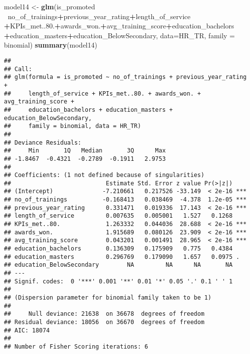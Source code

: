\documentclass[
]{article}
\newenvironment{Shaded}{\begin{snugshade}}{\end{snugshade}}
\newcommand{\DataTypeTok}[1]{\textcolor[rgb]{0.13,0.29,0.53}{#1}}
\newcommand{\FloatTok}[1]{\textcolor[rgb]{0.00,0.00,0.81}{#1}}
\newcommand{\KeywordTok}[1]{\textcolor[rgb]{0.13,0.29,0.53}{\textbf{#1}}}
\newcommand{\NormalTok}[1]{#1}
\newcommand{\OperatorTok}[1]{\textcolor[rgb]{0.81,0.36,0.00}{\textbf{#1}}}
\newcommand{\StringTok}[1]{\textcolor[rgb]{0.31,0.60,0.02}{#1}}
\begin{document}
\begin{Shaded}
\begin{Highlighting}[]
\NormalTok{model14 <-}\StringTok{ }\KeywordTok{glm}\NormalTok{(is_promoted }\OperatorTok{~}\NormalTok{no_of_trainings}\OperatorTok{+}\NormalTok{previous_year_rating}\OperatorTok{+}\NormalTok{length_of_service}
               \OperatorTok{+}\NormalTok{KPIs_met..}\FloatTok{80.}\OperatorTok{+}\NormalTok{awards_won.}\OperatorTok{+}\NormalTok{avg_training_score}\OperatorTok{+}\NormalTok{education_bachelors}
               \OperatorTok{+}\NormalTok{education_masters}\OperatorTok{+}\NormalTok{education_BelowSecondary, }
               \DataTypeTok{data=}\NormalTok{HR_TR, }\DataTypeTok{family =}\NormalTok{ binomial)}
\KeywordTok{summary}\NormalTok{(model14)}
\end{Highlighting}
\end{Shaded}

\begin{verbatim}
## 
## Call:
## glm(formula = is_promoted ~ no_of_trainings + previous_year_rating + 
##     length_of_service + KPIs_met..80. + awards_won. + avg_training_score + 
##     education_bachelors + education_masters + education_BelowSecondary, 
##     family = binomial, data = HR_TR)
## 
## Deviance Residuals: 
##     Min       1Q   Median       3Q      Max  
## -1.8467  -0.4321  -0.2789  -0.1911   2.9753  
## 
## Coefficients: (1 not defined because of singularities)
##                           Estimate Std. Error z value Pr(>|z|)    
## (Intercept)              -7.210661   0.217526 -33.149  < 2e-16 ***
## no_of_trainings          -0.168413   0.038469  -4.378  1.2e-05 ***
## previous_year_rating      0.331471   0.019336  17.143  < 2e-16 ***
## length_of_service         0.007635   0.005001   1.527   0.1268    
## KPIs_met..80.             1.263332   0.044036  28.688  < 2e-16 ***
## awards_won.               1.915689   0.080126  23.909  < 2e-16 ***
## avg_training_score        0.043201   0.001491  28.965  < 2e-16 ***
## education_bachelors       0.136309   0.175909   0.775   0.4384    
## education_masters         0.296769   0.179090   1.657   0.0975 .  
## education_BelowSecondary        NA         NA      NA       NA    
## ---
## Signif. codes:  0 '***' 0.001 '**' 0.01 '*' 0.05 '.' 0.1 ' ' 1
## 
## (Dispersion parameter for binomial family taken to be 1)
## 
##     Null deviance: 21638  on 36678  degrees of freedom
## Residual deviance: 18056  on 36670  degrees of freedom
## AIC: 18074
## 
## Number of Fisher Scoring iterations: 6
\end{verbatim}
\end{document}
